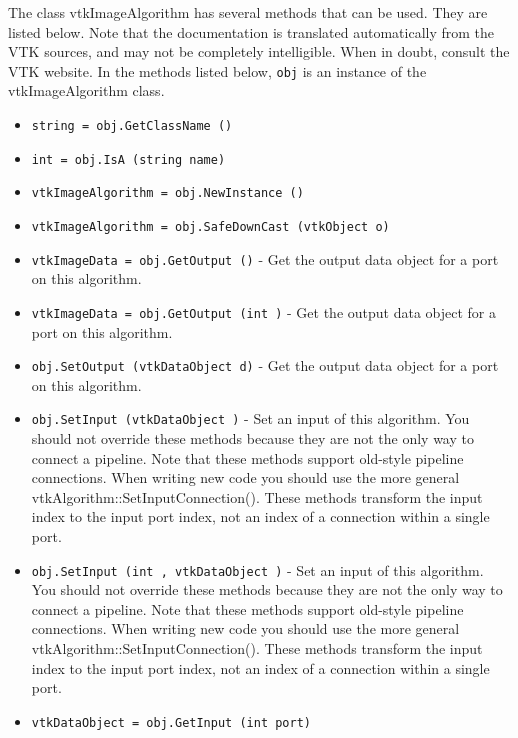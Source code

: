 The class vtkImageAlgorithm has several methods that can be used.
  They are listed below.
Note that the documentation is translated automatically from the VTK sources,
and may not be completely intelligible.  When in doubt, consult the VTK website.
In the methods listed below, \verb|obj| is an instance of the vtkImageAlgorithm class.
\begin{itemize}
\item  \verb|string = obj.GetClassName ()|

\item  \verb|int = obj.IsA (string name)|

\item  \verb|vtkImageAlgorithm = obj.NewInstance ()|

\item  \verb|vtkImageAlgorithm = obj.SafeDownCast (vtkObject o)|

\item  \verb|vtkImageData = obj.GetOutput ()| -  Get the output data object for a port on this algorithm.

\item  \verb|vtkImageData = obj.GetOutput (int )| -  Get the output data object for a port on this algorithm.

\item  \verb|obj.SetOutput (vtkDataObject d)| -  Get the output data object for a port on this algorithm.

\item  \verb|obj.SetInput (vtkDataObject )| -  Set an input of this algorithm. You should not override these
 methods because they are not the only way to connect a pipeline.
 Note that these methods support old-style pipeline connections.
 When writing new code you should use the more general
 vtkAlgorithm::SetInputConnection().  These methods transform the
 input index to the input port index, not an index of a connection
 within a single port.

\item  \verb|obj.SetInput (int , vtkDataObject )| -  Set an input of this algorithm. You should not override these
 methods because they are not the only way to connect a pipeline.
 Note that these methods support old-style pipeline connections.
 When writing new code you should use the more general
 vtkAlgorithm::SetInputConnection().  These methods transform the
 input index to the input port index, not an index of a connection
 within a single port.

\item  \verb|vtkDataObject = obj.GetInput (int port)|


\end{itemize}
